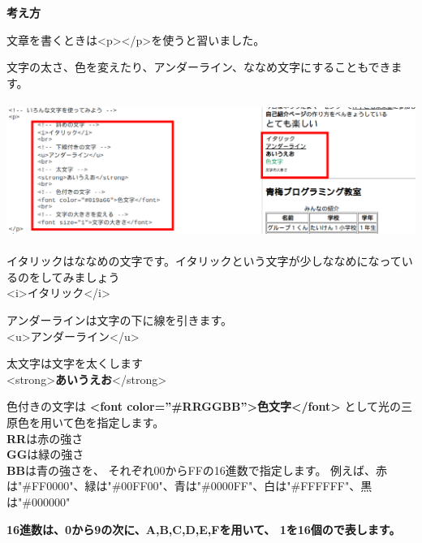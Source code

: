 \documentclass[a4paper,12pt]{jarticle}
\begin{document}
\bigskip

\flushleft
\textbf{考え方}



文章を書くときは{\textless}p{\textgreater}{\textless}/p{\textgreater}を使うと習いました。

文字の太さ、色を変えたり、アンダーライン、ななめ文字にすることもできます。

\centering
\includegraphics[width=14.284cm,height=4.427cm]{textbook-img186.png}

\bigskip

\flushleft

イタリックはななめの文字です。イタリックという文字が少しななめになっているのをしてみましょう\\
{\textless}i{\textgreater}イタリック{\textless}/i{\textgreater}\\

\bigskip

アンダーラインは文字の下に線を引きます。\\
{\textless}u{\textgreater}アンダーライン{\textless}/u{\textgreater}\\

\bigskip

太文字は文字を太くします\\
{\textless}strong{\textgreater}\textbf{あいうえお}{\textless}/strong{\textgreater}


\bigskip
色付きの文字は
\textbf{{\textless}font color=”\#RRGGBB”{\textgreater}色文字{\textless}/font{\textgreater}}
として光の三原色を用いて色を指定します。\\
\textbf{RR}は赤の強さ\\
\textbf{GG}は緑の強さ\\
\textbf{BB}は青の強さを、
それぞれ00からFFの16進数で指定します。
例えば、赤は"\#FF0000"、緑は"\#00FF00"、青は"\#0000FF"、白は"\#FFFFFF"、黒は"\#000000"

\bigskip
\textbf{16進数は、0から9の次に、A,B,C,D,E,Fを用いて、
  1を16個ので表します。}
\end{document}
